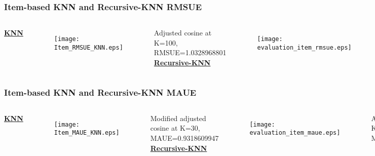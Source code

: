 \begin{frame}[t]
    \frametitle{Item-based KNN and Recursive-KNN RMSUE}
    \vspace{-0.7cm}
    \begin{columns}
        \centering
        \underline{\textbf{KNN}}
    \begin{figure}
    \centering
    \texttt{[image: Item\_RMSUE\_KNN.eps]}
    \end{figure}
    \centering
    \tiny
    Adjusted cosine at K=100, RMSUE=1.0328968801
        \centering
        \underline{\textbf{Recursive-KNN}}
    \begin{figure}
    \centering
    \texttt{[image: evaluation\_item\_rmsue.eps]}
    \end{figure}
    \centering
    \tiny
    Adjusted cosine at K=100 \& M=3, RMSUE=1.0367245756
\end{columns}
\end{frame}
\begin{frame}[t]
    \frametitle{Item-based KNN and Recursive-KNN MAUE}
    \vspace{-0.7cm}
    \begin{columns}
        \centering
        \underline{\textbf{KNN}}
    \begin{figure}
    \centering
    \texttt{[image: Item\_MAUE\_KNN.eps]}
    \end{figure}
    \centering
    \tiny
    Modified adjusted cosine at K=30, MAUE=0.9318609947
        \centering
        \underline{\textbf{Recursive-KNN}}
    \begin{figure}
    \centering
    \texttt{[image: evaluation\_item\_maue.eps]}
    \end{figure}
    \centering
    \tiny
    Adjusted cosine at K=90 \& M=3, MAUE=0.9864005988
\end{columns}
\end{frame}
